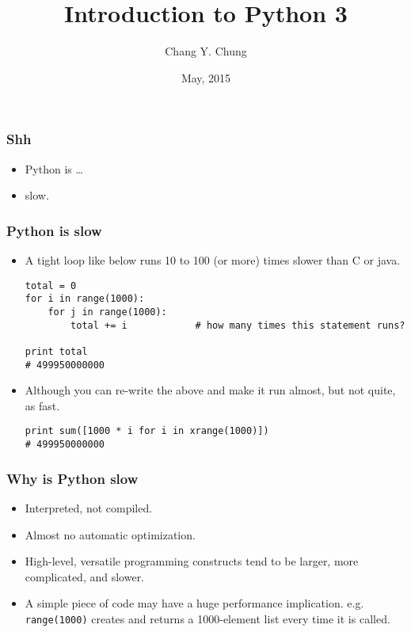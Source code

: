 \documentclass{beamer}
\begin{document}
\title{Introduction to Python 3}
\date{May, 2015}
\author{Chang Y. Chung}
\institute{}

{
\begin{frame}[noframenumbering]
\titlepage
\end{frame}}

\begin{frame}[fragile]
\frametitle{Shh}
\begin{itemize}
\item<1-> Python is \ldots
\item<2-> slow.
\end{itemize}
\end{frame}

\begin{frame}[fragile]
\frametitle{Python is slow}
\begin{itemize}
\item<1-> A tight loop like below runs 10 to 100 (or more)
          times slower than C or java.
\begin{lstlisting}
total = 0
for i in range(1000):
    for j in range(1000):
        total += i            # how many times this statement runs?

print total
# 499950000000
\end{lstlisting}
\item<2-> Although you can re-write the above and make
          it run almost, but not quite, as fast.
\begin{lstlisting}
print sum([1000 * i for i in xrange(1000)])
# 499950000000
\end{lstlisting}
\end{itemize}
\end{frame}

\begin{frame}[fragile]
\frametitle{Why is Python slow}
\begin{itemize}
\item Interpreted, not compiled.
\item Almost no automatic optimization.
\item High-level, versatile programming constructs tend 
      to be larger, more complicated, and slower.
\item A simple piece of code may have a huge performance
      implication. e.g. \lstinline{range(1000)}
      creates and returns
      a 1000-element list every time it is called.
\end{itemize}
\end{frame}
\end{document}
